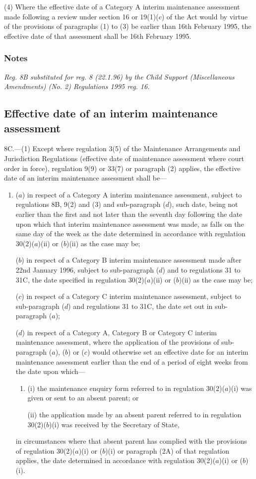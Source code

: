 \documentclass[a4paper]{article}
\newcommand\amendment[1]{\subsubsection*{Notes}{\itshape\frenchspacing\footnotesize #1 \par}}
\begin{document}
(4) Where the effective date of a Category A interim maintenance assessment made following a review under section 16 or 19(1)($c$) of the Act would by virtue of the provisions of paragraphs (1) to (3) be earlier than 16th February 1995, the effective date of that assessment shall be 16th February 1995.

\amendment{
Reg. 8B substituted for reg. 8 (22.1.96) by the Child Support (Miscellaneous Amendments) (No. 2) Regulations 1995 reg. 16.
}

\subsection[8C. Effective date of an interim maintenance assessment]{Effective date of an interim maintenance assessment}

8C.—(1) Except where regulation 3(5) of the Maintenance Arrangements and Jurisdiction Regulations (effective date of maintenance assessment where court order in force), regulation 9(9) or 33(7) or paragraph (2) applies, the effective date of an interim maintenance assessment shall be—
\begin{enumerate}\item[]
($a$) in respect of a Category A interim maintenance assessment, subject to regulations 8B, 9(2) and (3) and sub-paragraph ($d$), such date, being not earlier than the first and not later than the seventh day following the date upon which that interim maintenance assessment was made, as falls on the same day of the week as the date determined in accordance with regulation 30(2)($a$)(ii) or ($b$)(ii) as the case may be;

($b$) in respect of a Category B interim maintenance assessment made after 22nd January 1996, subject to sub-paragraph ($d$) and to regulations 31 to 31C, the date specified in regulation 30(2)($a$)(ii) or ($b$)(ii) as the case may be;

($c$) in respect of a Category C interim maintenance assessment, subject to sub-paragraph ($d$) and regulations 31 to 31C, the date set out in sub-paragraph ($a$);

($d$) in respect of a Category A, Category B or Category C interim maintenance assessment, where the application of the provisions of sub-\hspace{0pt}paragraph ($a$), ($b$) or ($c$) would otherwise set an effective date for an interim maintenance assessment earlier than the end of a period of eight weeks from the date upon which—
\begin{enumerate}\item[]
(i) the maintenance enquiry form referred to in regulation 30(2)($a$)(i) was given or sent to an absent parent; or

(ii) the application made by an absent parent referred to in regulation 30(2)($b$)(i) was received by the Secretary of State,
\end{enumerate}
in circumstances where that absent parent has complied with the provisions of regulation 30(2)($a$)(i) or ($b$)(i) or paragraph (2A) of that regulation applies, the date determined in accordance with regulation 30(2)($a$)(i) or ($b$)(i).
\end{enumerate}
\end{document}

